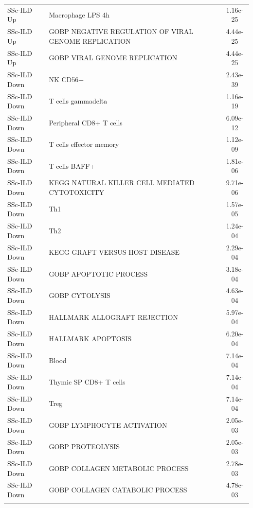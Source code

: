 \documentclass[
]{article}
\begin{document}
\begin{singlespace}
\begin{longtable}[t]{>{\raggedright\arraybackslash}p{1.0in}>{\raggedright\arraybackslash}p{4.5in}c}
SSc-ILD Up & Macrophage LPS 4h & 1.16e-25\\
SSc-ILD Up & GOBP NEGATIVE REGULATION OF VIRAL GENOME REPLICATION & 4.44e-25\\
SSc-ILD Up & GOBP VIRAL GENOME REPLICATION & 4.44e-25\\
\addlinespace
SSc-ILD Down & NK CD56+ & 2.43e-39\\
SSc-ILD Down & T cells gammadelta & 1.16e-19\\
SSc-ILD Down & Peripheral CD8+ T cells & 6.09e-12\\
SSc-ILD Down & T cells effector memory & 1.12e-09\\
SSc-ILD Down & T cells BAFF+ & 1.81e-06\\
\addlinespace
SSc-ILD Down & KEGG NATURAL KILLER CELL MEDIATED CYTOTOXICITY & 9.71e-06\\
SSc-ILD Down & Th1 & 1.57e-05\\
SSc-ILD Down & Th2 & 1.24e-04\\
SSc-ILD Down & KEGG GRAFT VERSUS HOST DISEASE & 2.29e-04\\
SSc-ILD Down & GOBP APOPTOTIC PROCESS & 3.18e-04\\
\addlinespace
SSc-ILD Down & GOBP CYTOLYSIS & 4.63e-04\\
SSc-ILD Down & HALLMARK ALLOGRAFT REJECTION & 5.97e-04\\
SSc-ILD Down & HALLMARK APOPTOSIS & 6.20e-04\\
SSc-ILD Down & Blood & 7.14e-04\\
SSc-ILD Down & Thymic SP CD8+ T cells & 7.14e-04\\
\addlinespace
SSc-ILD Down & Treg & 7.14e-04\\
SSc-ILD Down & GOBP LYMPHOCYTE ACTIVATION & 2.05e-03\\
SSc-ILD Down & GOBP PROTEOLYSIS & 2.05e-03\\
SSc-ILD Down & GOBP COLLAGEN METABOLIC PROCESS & 2.78e-03\\
SSc-ILD Down & GOBP COLLAGEN CATABOLIC PROCESS & 4.78e-03\\*
\end{longtable}
\endgroup{}

\pagebreak



\begingroup\fontsize{8}{10}\selectfont


\end{singlespace}
\end{document}
